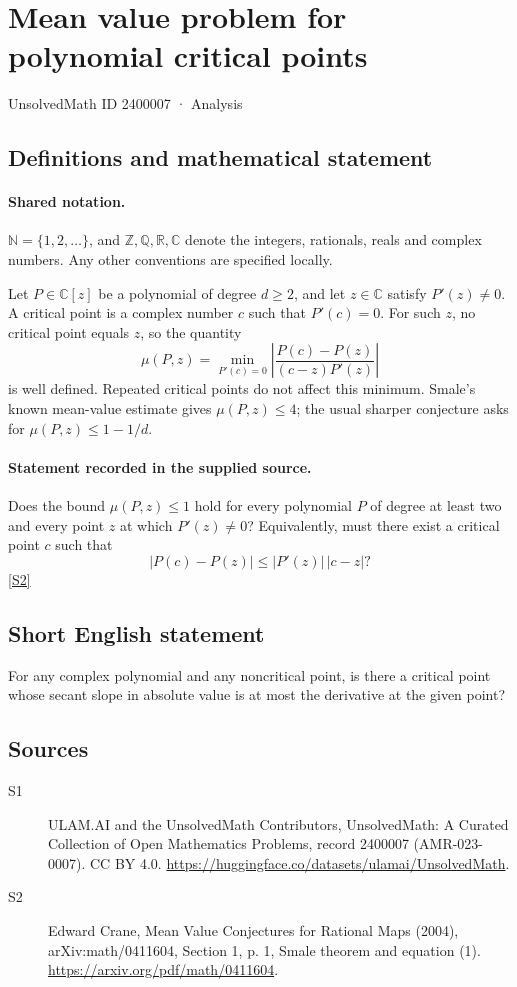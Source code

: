 \documentclass[11pt]{article}
\newcommand{\sref}[2]{\hyperlink{source:#1:#2}{[S#2]}}
\begin{document}
\setcounter{section}{2400006}
\section{Mean value problem for polynomial critical points}\label{2400007}
{\small\sffamily UnsolvedMath ID 2400007 · Analysis}
\subsection{Definitions and mathematical statement}

\paragraph{Shared notation.}$\mathbb N=\{1,2,\ldots\}$, and $\mathbb Z,\mathbb Q,\mathbb R,\mathbb C$ denote the integers, rationals, reals and complex numbers. Any other conventions are specified locally.


Let \(P\in\mathbb C[z]\) be a polynomial of degree \(d\ge2\), and let \(z\in\mathbb C\) satisfy \(P'(z)\ne0\). A critical point is a complex number \(c\) such that \(P'(c)=0\). For such \(z\), no critical point equals \(z\), so the quantity
\[\mu(P,z)=\min_{P'(c)=0}\left|\frac{P(c)-P(z)}{(c-z)P'(z)}\right|\]
is well defined. Repeated critical points do not affect this minimum. Smale's known mean-value estimate gives \(\mu(P,z)\le4\); the usual sharper conjecture asks for \(\mu(P,z)\le1-1/d\).
\paragraph{Statement recorded in the supplied source.}
Does the bound \(\mu(P,z)\le1\) hold for every polynomial \(P\) of degree at least two and every point \(z\) at which \(P'(z)\ne0\)? Equivalently, must there exist a critical point \(c\) such that
\[|P(c)-P(z)|\le |P'(z)|\,|c-z|?\] \sref{2400007}{2}
\subsection{Short English statement}
For any complex polynomial and any noncritical point, is there a critical point whose secant slope in absolute value is at most the derivative at the given point?
\subsection{Sources}
\begin{description}
\item[\hypertarget{source:2400007:1}{S1}] ULAM.AI and the UnsolvedMath Contributors, UnsolvedMath: A Curated Collection of Open Mathematics Problems, record 2400007 (AMR-023-0007). CC BY 4.0. \url{https://huggingface.co/datasets/ulamai/UnsolvedMath}.
\item[\hypertarget{source:2400007:2}{S2}] Edward Crane, Mean Value Conjectures for Rational Maps (2004), arXiv:math/0411604, Section 1, p. 1, Smale theorem and equation (1). \url{https://arxiv.org/pdf/math/0411604}.
\end{description}
\label{end:2400007}
\end{document}
